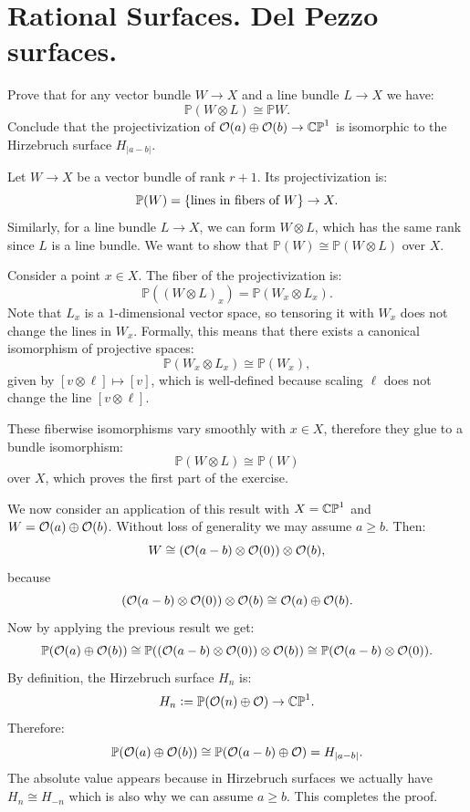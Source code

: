 \documentclass[11pt, a4paper]{article}
\renewcommand{\P}{\mathbb{P}}
\begin{document}
\newpage

\section{Rational Surfaces. Del Pezzo surfaces.}

\begin{exercise}
  Prove that for any vector bundle $W \to X$ and a line
  bundle $L \to X$ we have:
  \[
    \P(W \otimes L) \cong \P W.
  \]
  Conclude that the projectivization of $\mathcal{O}(a) \oplus \mathcal{O}(b) \to \mathbb{CP}^1$
  is isomorphic to the Hirzebruch surface $H_{|a-b|}$.
\end{exercise}
\begin{solution}
  Let $W \to X$ be a vector bundle of rank $r + 1$. 
  Its projectivization is:
  \[
    \P(W) = \set{\text{lines in fibers of $W$}} \to X.
  \]
  Similarly, for a line bundle $L \to X$, we can form $W \otimes L$,
  which has the same rank since $L$ is a line bundle.
  We want to show that $\P(W) \cong \P(W \otimes L)$ over $X$. 

  Consider a point $x \in X$. 
  The fiber of the projectivization is:
  \[
    \P((W \otimes L)_x) = \P(W_x \otimes L_x).
  \]
  Note that $L_x$ is a $1$-dimensional vector space,
  so tensoring it with $W_x$ does not change the lines in $W_x$. 
  Formally, this means that there exists a canonical isomorphism of
  projective spaces:
  \[
    \P(W_x \otimes L_x) \cong \P(W_x),
  \]
  given by $[v \otimes \ell] \mapsto [v]$,
  which is well-defined because scaling $\ell$ does not change the line
  $[v \otimes \ell]$. 

  These fiberwise isomorphisms vary smoothly with $x \in X$,
  therefore they glue to a bundle isomorphism:
  \[
    \P(W \otimes L) \cong \P(W)
  \]
  over $X$, which proves the first part of the exercise. 

  We now consider an application of this result with $X = \mathbb{CP}^1$
  and $W = \mathcal{O}(a) \oplus \mathcal{O}(b)$. 
  Without loss of generality we may assume $a \geq b$. 
  Then:
  \[
    W \cong (\mathcal{O}(a - b) \otimes \mathcal{O}(0)) \otimes \mathcal{O}(b),
  \]
  because 
  \[
    (\mathcal{O}(a - b) \otimes \mathcal{O}(0)) \otimes \mathcal{O}(b) \cong \mathcal{O}(a) \oplus \mathcal{O}(b).
  \]
  Now by applying the previous result we get:
  \[
    \P(\O(a) \oplus \O(b)) \cong 
    \P((\O(a - b) \otimes \O(0)) \otimes \O(b)) \cong 
    \P(\O(a - b) \otimes \O(0)).
  \]
  By definition, the Hirzebruch surface $H_n$ is:
  \[
    H_n := \P(\O(n) \oplus \O) \to \CP^1.
  \]
  Therefore:
  \[
    \P(\O(a) \oplus \O(b)) \cong \P(\O(a - b) \oplus \O) = H_{|a-b|}.
  \]
  The absolute value appears because in Hirzebruch surfaces we actually
  have $H_n \cong H_{-n}$ which is also why we can assume $a \geq b$. 
  This completes the proof.
\end{solution}
\end{document}
